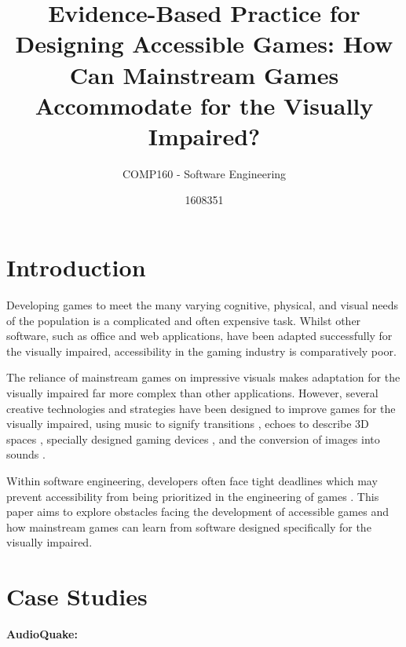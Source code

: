 \documentclass{scrartcl}
\title{Evidence-Based Practice for Designing Accessible Games: How Can Mainstream Games Accommodate for the Visually Impaired?}
\subtitle{COMP160 - Software Engineering}
\author{1608351}
\begin{document}
\maketitle


\section{Introduction}

{Developing games to meet the many varying cognitive, physical, and visual needs of the population is a complicated and often expensive task. Whilst other software, such as office and web applications,  have been adapted successfully for the visually impaired, accessibility in the gaming industry is comparatively poor.

The reliance of mainstream games on impressive visuals makes adaptation for the visually impaired far more complex than other applications. However, several creative technologies and strategies have been designed to improve games for the visually impaired,  using music to signify transitions \cite{1}, echoes to describe 3D spaces \cite{5}, specially designed gaming devices \cite{2} \cite{8}, and the conversion of images into sounds \cite{9}.

Within software engineering, developers often face tight deadlines which may prevent accessibility from being prioritized in the engineering of games \cite{3} \cite{10} . This paper aims to explore obstacles facing the development of accessible games and how mainstream games can learn from software designed specifically for the visually impaired.}


\section{Case Studies}

\textbf{AudioQuake:}
 
\end{document}
